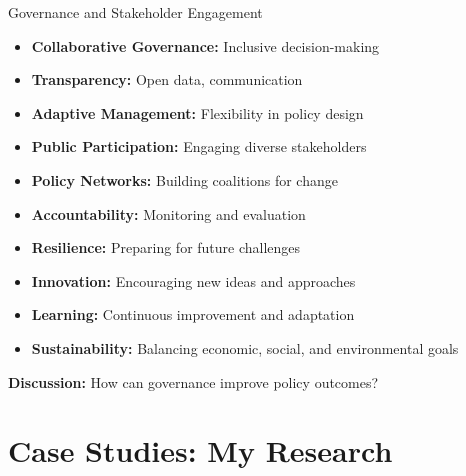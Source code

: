\documentclass[11pt, aspectratio=169]{beamer}
\begin{document}
\begin{frame}{Governance and Stakeholder Engagement}
    \begin{itemize}
        \item \textbf{Collaborative Governance:} Inclusive decision-making
        \item \textbf{Transparency:} Open data, communication
        \item \textbf{Adaptive Management:} Flexibility in policy design
        \item \textbf{Public Participation:} Engaging diverse stakeholders
        \item \textbf{Policy Networks:} Building coalitions for change
        \item \textbf{Accountability:} Monitoring and evaluation
        \item \textbf{Resilience:} Preparing for future challenges
        \item \textbf{Innovation:} Encouraging new ideas and approaches
        \item \textbf{Learning:} Continuous improvement and adaptation
        \item \textbf{Sustainability:} Balancing economic, social, and environmental goals
    \end{itemize}
    \pause
    \textbf{Discussion:} How can governance improve policy outcomes?
\end{frame}



\section{Case Studies: My Research}
\end{document}
